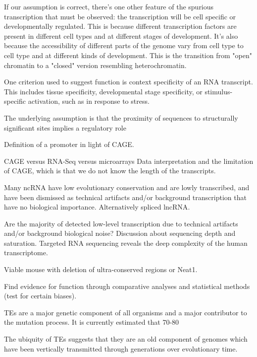 If our assumption is correct, there's one other feature of the spurious transcription that must be observed: the transcription will be cell specific or developmentally regulated. This is because different transcription factors are present in different cell types and at different stages of development. It's also because the accessibility of different parts of the genome vary from cell type to cell type and at different kinds of development. This is the transition from "open" chromatin to a "closed" version resembling heterochromatin.

One criterion used to suggest function is context specificity of an RNA transcript. This includes tissue specificity, developmental stage specificity, or stimulus-specific activation, such as in response to stress.

The underlying assumption is that the proximity of sequences to structurally significant sites implies a regulatory role

Definition of a promoter in light of CAGE.

CAGE versus RNA-Seq versus microarrays\cite{pmid24676093} Data interpretation and the limitation of CAGE, which is that we do not know the length of the transcripts.

Many ncRNA have low evolutionary conservation and are lowly transcribed, and have been dismissed as technical artifacts and/or background transcription that have no biological importance. Alternatively spliced lncRNA\cite{Johnsson2013}.

Are the majority of detected low-level transcription due to technical artifacts and/or background biological noise? Discussion about sequencing depth and saturation. Targeted RNA sequencing reveals the deep complexity of the human transcriptome\cite{pmid22081020}.

Viable mouse with deletion of ultra-conserved regions\cite{pmid17803355} or Neat1\cite{pmid21444682}.

Find evidence for function through comparative analyses and statistical methods (test for certain biases).


TEs are a major genetic component of all organisms and a major contributor to the mutation process. It is currently estimated that 70-80%

The ubiquity of TEs suggests that they are an old component of genomes which have been vertically transmitted through generations over evolutionary time.

